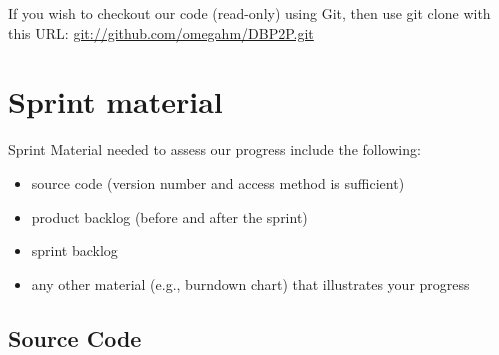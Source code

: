 \documentclass[a4paper,11pt]{article}
\begin{document}
If you wish to checkout our code (read-only) using Git, then use git clone with this URL:
\url{git://github.com/omegahm/DBP2P.git}


\section{Sprint material}
Sprint Material needed to assess our progress include the following:
\begin{itemize}
\item source code (version number and access method is sufficient)
\item product backlog (before and after the sprint)
\item sprint backlog
\item any other material (e.g., burndown chart) that illustrates your progress
\end{itemize}


\subsection{Source Code}


\end{document}
